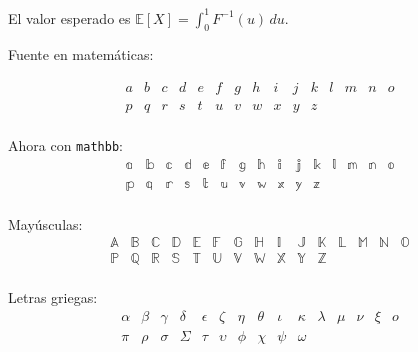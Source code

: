 \documentclass[10pt,a4paper]{article}
\begin{document}
    El valor esperado es \( \mathbb{E}[X] = \int_{0}^{1} F^{-1}(u) \, du \).


    Fuente en matemáticas: 

    \[
    \begin{array}{lllllllllllllll}
    a & b & c & d & e & f & g & h & i & j & k & l & m & n & o \\
    p & q & r & s & t & u & v & w & x & y & z & & & & \\
    \end{array}
    \]

    Ahora con \texttt{mathbb}:
    \[
    \begin{array}{lllllllllllllll}
    \mathbb{a} & \mathbb{b} & \mathbb{c} & \mathbb{d} & \mathbb{e} & \mathbb{f} & \mathbb{g} & \mathbb{h} & \mathbb{i} & \mathbb{j} & \mathbb{k} & \mathbb{l} & \mathbb{m} & \mathbb{n} & \mathbb{o} \\
    \mathbb{p} & \mathbb{q} & \mathbb{r} & \mathbb{s} & \mathbb{t} & \mathbb{u} & \mathbb{v} & \mathbb{w} & \mathbb{x} & \mathbb{y} & \mathbb{z} & & & & \\
    \end{array}
    \]

    Mayúsculas:
    \[
    \begin{array}{lllllllllllllll}
    \mathbb{A} & \mathbb{B} & \mathbb{C} & \mathbb{D} & \mathbb{E} & \mathbb{F} & \mathbb{G} & \mathbb{H} & \mathbb{I} & \mathbb{J} & \mathbb{K} & \mathbb{L} & \mathbb{M} & \mathbb{N} & \mathbb{O} \\
    \mathbb{P} & \mathbb{Q} & \mathbb{R} & \mathbb{S} & \mathbb{T} & \mathbb{U} & \mathbb{V} & \mathbb{W} & \mathbb{X} & \mathbb{Y} & \mathbb{Z} & & & & \\
    \end{array}
    \]

    Letras griegas:
    \[
    \begin{array}{lllllllllllllll}
    \alpha & \beta & \gamma & \delta & \epsilon & \zeta & \eta & \theta & \iota & \kappa & \lambda & \mu & \nu & \xi & o \\
    \pi & \rho & \sigma & \Sigma & \tau & \upsilon & \phi & \chi & \psi & \omega & & & & & \\
    \end{array}
    \]
\end{document}
